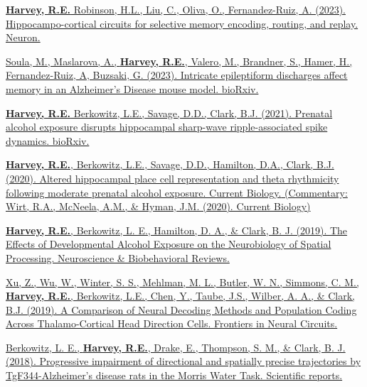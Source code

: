 \begin{cventries}
\cventry
    {} %
    {} %
    {} %
    {} %
    {
      \begin{cvitems} %
      \setlength\itemsep{0.5em}
            \item {\href{https://doi.org/10.1016/j.neuron.2023.04.015}{\textbf{Harvey, R.E.} Robinson, H.L., Liu, C., Oliva, O., Fernandez-Ruiz, A. (2023). Hippocampo-cortical circuits for selective memory encoding, routing, and replay. Neuron.}}
            \item {\href{https://doi.org/10.1101/2023.02.15.528683}{Soula, M., Maslarova, A., \textbf{Harvey, R.E.}, Valero, M., Brandner, S., Hamer, H., Fernandez-Ruiz, A, Buzsaki, G. (2023). Intricate epileptiform discharges affect memory in an Alzheimer's Disease mouse model. bioRxiv.}}
            \item {\href{https://doi.org/10.1101/2021.06.29.450435}{\textbf{Harvey, R.E.} Berkowitz, L.E., Savage, D.D., Clark, B.J. (2021). Prenatal alcohol exposure disrupts hippocampal sharp-wave ripple-associated spike dynamics. bioRxiv.}}
            \item {\href{https://doi.org/10.1016/j.cub.2020.06.077}{\textbf{Harvey, R.E.}, Berkowitz, L.E., Savage, D.D., Hamilton, D.A., Clark, B.J. (2020). Altered hippocampal place cell representation and theta rhythmicity following moderate prenatal alcohol exposure. Current Biology.}\href{https://doi.org/10.1016/j.cub.2020.07.020}{{ (\scriptsize Commentary: Wirt, R.A., McNeela, A.M., \& Hyman, J.M. (2020). Current Biology})}}
            \item {\href{https://doi.org/10.1016/j.neubiorev.2019.09.018}{\textbf{Harvey, R.E.}, Berkowitz, L. E., Hamilton, D. A., \& Clark, B. J. (2019). The Effects of Developmental Alcohol Exposure on the Neurobiology of Spatial Processing. Neuroscience \& Biobehavioral Reviews.}}
            \item {\href{https://doi.org/10.3389/fncir.2019.00075}{Xu, Z., Wu, W., Winter, S. S., Mehlman, M. L., Butler, W. N., Simmons, C. M., \textbf{Harvey, R.E.}, Berkowitz, L.E., Chen, Y., Taube, J.S., Wilber, A. A., \& Clark, B.J. (2019). A Comparison of Neural Decoding Methods and Population Coding Across Thalamo-Cortical Head Direction Cells. Frontiers in Neural Circuits.}}
            \item {\href{https://doi.org/10.1038/s41598-018-34368-w}{Berkowitz, L. E., \textbf{Harvey, R.E.}, Drake, E., Thompson, S. M., \& Clark, B. J. (2018). Progressive impairment of directional and spatially precise trajectories by TgF344-Alzheimer’s disease rats in the Morris Water Task. Scientific reports.}} 

\end{cvitems}}
\end{cventries}

